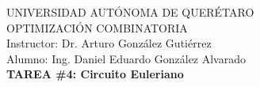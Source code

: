 \begin{center}

\LARGE
UNIVERSIDAD AUTÓNOMA DE QUERÉTARO \\
OPTIMIZACIÓN COMBINATORIA \\[0.3cm]

\Large
Instructor: Dr. Arturo González Gutiérrez \\
Alumno: Ing. Daniel Eduardo González Alvarado \\%
\large
\textbf{TAREA \#4: Circuito Euleriano}\\

\end{center}